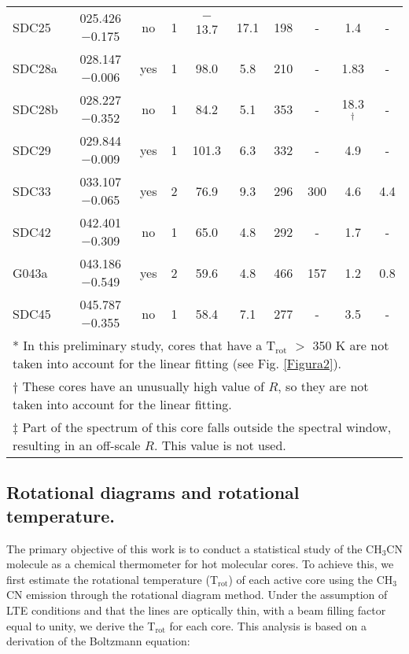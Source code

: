 \documentclass[baaa]{baaa}
\begin{document}
\begin{table*}[tt]
\begin{tabular}{lccccccccc}
SDC25  & 025.426 $-$0.175 & no                  & 1                     & $-$13.7               & 17.1             & 198  & -      &1.4             & -\\
SDC28a & 028.147 $-$0.006 & yes                 & 1                     & 98.0                & 5.8              & 210  & -      &1.83            & -\\
SDC28b & 028.227 $-$0.352 & no                  & 1                     & 84.2                & 5.1              & 353  & -      &18.3$^\dagger$  & -\\
SDC29  & 029.844 $-$0.009 & yes                 & 1                     & 101.3               & 6.3              & 332  & -      &4.9             & -\\
SDC33  & 033.107 $-$0.065 & yes                 & 2                     & 76.9                & 9.3              & 296  & 300    &4.6             &4.4 \\
SDC42  & 042.401 $-$0.309 & no                  & 1                     & 65.0                & 4.8              & 292  & -      &1.7             & - \\
G043a  & 043.186 $-$0.549 & yes                 & 2                     & 59.6                & 4.8              & 466  & 157    &1.2             &0.8 \\
SDC45  & 045.787 $-$0.355 & no                  & 1                     & 58.4                & 7.1              &277   & -      &3.5             & - \\
\hline
\multicolumn{10}{l}{* In this preliminary study, cores that have a T$_\mathrm{rot}$ $>$ 350 K are not taken into account for the linear fitting (see Fig. \ref{Figura2}).}\\
\multicolumn{10}{l}{$\dagger$ These cores have an unusually high value of $R$, so they are not taken into account for the linear fitting.}\\
\multicolumn{10}{l}{$\ddagger$ Part of the spectrum of this core falls outside the spectral window, resulting in an off-scale $R$. This value is not used.}\\
\end{tabular}
\end{table*}

\subsection{Rotational diagrams and rotational temperature.}

The primary objective of this work is to conduct a statistical study of the CH$_3$CN molecule as a chemical thermometer for hot molecular cores. To achieve this, we first estimate the rotational temperature (T$_\mathrm{rot}$) of each active core using the CH$_3$CN emission through the rotational diagram method. Under the assumption of LTE conditions and that the lines are optically thin, with a beam filling factor equal to unity, we derive the T$_\mathrm{rot}$ for each core. This analysis is based on a derivation of the Boltzmann equation:\\
\end{document}
